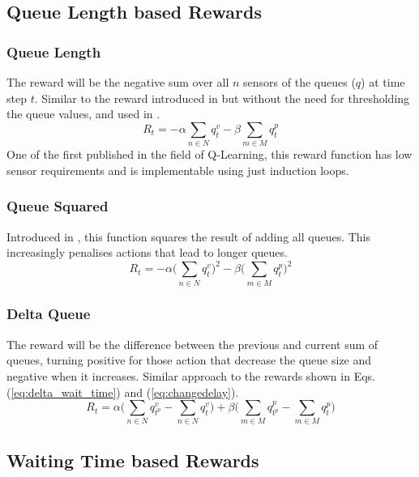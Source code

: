 \documentclass[conference]{IEEEtran}
\begin{document}
\subsection{Queue Length based Rewards}
\subsubsection{Queue Length}
The reward will be the negative sum over all $n$ sensors of the queues ($q$) at time step $t$.
Similar to the reward introduced in \cite{prashanth2011} but without the need for thresholding the queue values, and used in \cite{aslani2019}.
\begin{equation}
    R_t = - \alpha \sum_{n \in N} q^v_{t} - \beta \sum_{m \in M} q^p_{t}
\label{eq:queue}
\end{equation}
One of the first published in the field of Q-Learning, this reward function has low sensor requirements and is implementable using just induction loops.

\subsubsection{Queue Squared}
Introduced in \cite{gendersthesis}, this function squares the result of adding all queues.
This increasingly penalises actions that lead to longer queues.
\begin{equation}
   R_t = - \alpha \bigg( \sum_{n \in N} q^v_{t} \bigg)^2 - \beta \bigg( \sum_{m \in M} q^p_{t} \bigg)^2
\label{eq:queuesq} 
\end{equation}

\subsubsection{Delta Queue}
The reward will be the difference between the previous and current sum of queues, turning positive for those action that decrease the queue size and negative when it increases.
Similar approach to the rewards shown in Eqs. (\ref{eq:delta_wait_time}) and (\ref{eq:changedelay}).
\begin{equation}
    R_t = \alpha \bigg( \sum_{n \in N} q^v_{t^p} -\sum_{n \in N} q^v_{t} \bigg) + \beta \bigg( \sum_{m \in M} q^p_{t^p} - \sum_{m \in M} q^p_{t} \bigg)
    \label{deltaqueue}
\end{equation}

\subsection{Waiting Time based Rewards}
\end{document}
